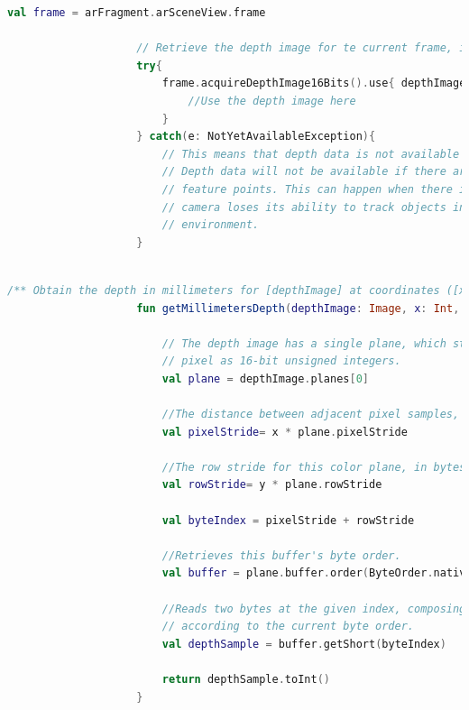 \documentclass[crop=false, class=book]{standalone}
\begin{document}
		\begin{center}
				\begin{minipage}{0.95\textwidth}
					\begin{lstlisting}[caption={ Estrazione di un'immagine profonda}, label={lst: depth-image}, language=Kotlin]
					val frame = arFragment.arSceneView.frame

					// Retrieve the depth image for te current frame, if available
					try{
						frame.acquireDepthImage16Bits().use{ depthImage ->
							//Use the depth image here
						}
					} catch(e: NotYetAvailableException){
						// This means that depth data is not available yet.
  						// Depth data will not be available if there are no tracked
  						// feature points. This can happen when there is no motion, or when the
  						// camera loses its ability to track objects in the surrounding
  						// environment. 
					}
					
					\end{lstlisting}
			\end{minipage}
		\end{center}
		\clearpage
		\begin{center}
				\begin{minipage}{0.95\textwidth}
					\begin{lstlisting}[caption={ Estrazione di informazioni da un'immagine profonda}, label={lst: inf-depth-img}, language=Kotlin]
					/** Obtain the depth in millimeters for [depthImage] at coordinates ([x], [y]). */
					fun getMillimetersDepth(depthImage: Image, x: Int, y: Int): Int {
					
  						// The depth image has a single plane, which stores depth for each
  						// pixel as 16-bit unsigned integers.
  						val plane = depthImage.planes[0]
  						
  						//The distance between adjacent pixel samples, in bytes
  						val pixelStride= x * plane.pixelStride
  						
  						//The row stride for this color plane, in bytes.
  						val rowStride= y * plane.rowStride
  						
  						val byteIndex = pixelStride + rowStride 
  						
  						//Retrieves this buffer's byte order. 
  						val buffer = plane.buffer.order(ByteOrder.nativeOrder())
  					
  						//Reads two bytes at the given index, composing them into a short value
  						// according to the current byte order.
  						val depthSample = buffer.getShort(byteIndex)
  						
  						return depthSample.toInt()
					}
					
					\end{lstlisting}
			\end{minipage}
		\end{center}
		
\end{document}
